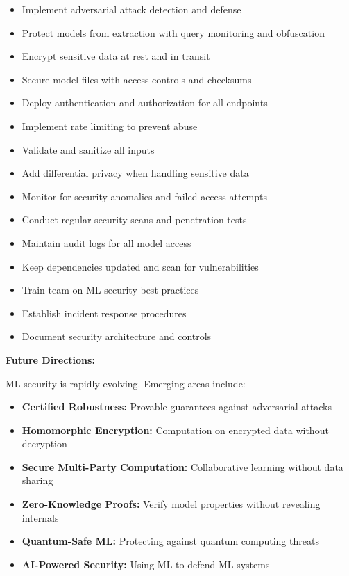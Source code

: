 \begin{itemize}
    \item[$\square$] Implement adversarial attack detection and defense
    \item[$\square$] Protect models from extraction with query monitoring and obfuscation
    \item[$\square$] Encrypt sensitive data at rest and in transit
    \item[$\square$] Secure model files with access controls and checksums
    \item[$\square$] Deploy authentication and authorization for all endpoints
    \item[$\square$] Implement rate limiting to prevent abuse
    \item[$\square$] Validate and sanitize all inputs
    \item[$\square$] Add differential privacy when handling sensitive data
    \item[$\square$] Monitor for security anomalies and failed access attempts
    \item[$\square$] Conduct regular security scans and penetration tests
    \item[$\square$] Maintain audit logs for all model access
    \item[$\square$] Keep dependencies updated and scan for vulnerabilities
    \item[$\square$] Train team on ML security best practices
    \item[$\square$] Establish incident response procedures
    \item[$\square$] Document security architecture and controls
\end{itemize}

\textbf{Future Directions:}

ML security is rapidly evolving. Emerging areas include:
\begin{itemize}
    \item \textbf{Certified Robustness:} Provable guarantees against adversarial attacks
    \item \textbf{Homomorphic Encryption:} Computation on encrypted data without decryption
    \item \textbf{Secure Multi-Party Computation:} Collaborative learning without data sharing
    \item \textbf{Zero-Knowledge Proofs:} Verify model properties without revealing internals
    \item \textbf{Quantum-Safe ML:} Protecting against quantum computing threats
    \item \textbf{AI-Powered Security:} Using ML to defend ML systems
\end{itemize}

